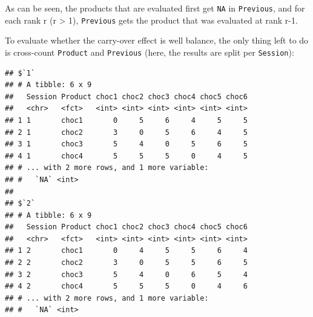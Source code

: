 \documentclass[
]{krantz}
\makeatletter
\newenvironment{Shaded}{\begin{snugshade}}{\end{snugshade}}
\newcommand{\AttributeTok}[1]{\textcolor[rgb]{0.61,0.61,0.61}{#1}}
\newcommand{\DecValTok}[1]{\textcolor[rgb]{0.06,0.06,0.06}{#1}}
\newcommand{\FunctionTok}[1]{\textcolor[rgb]{0,0,0}{#1}}
\newcommand{\NormalTok}[1]{#1}
\newcommand{\SpecialCharTok}[1]{\textcolor[rgb]{0,0,0}{#1}}
\newcommand{\StringTok}[1]{\textcolor[rgb]{0.5,0.5,0.5}{#1}}
\newenvironment{kframe}{%
\medskip{}
\setlength{\fboxsep}{.8em}
 \def\at@end@of@kframe{}%
 \ifinner\ifhmode%
  \def\at@end@of@kframe{\end{minipage}}%
  \begin{minipage}{\columnwidth}%
 \fi\fi%
 \def\FrameCommand##1{\hskip\@totalleftmargin \hskip-\fboxsep
 \colorbox{shadecolor}{##1}\hskip-\fboxsep
     \hskip-\linewidth \hskip-\@totalleftmargin \hskip\columnwidth}%
 \MakeFramed {\advance\hsize-\width
   \@totalleftmargin\z@ \linewidth\hsize
   \@setminipage}}%
 {\par\unskip\endMakeFramed%
 \at@end@of@kframe}
\renewenvironment{Shaded}{\begin{kframe}}{\end{kframe}}
\makeatother
\begin{document}
As can be seen, the products that are evaluated first get \texttt{NA} in \texttt{Previous}, and for each rank r (r \textgreater{} 1), \texttt{Previous} gets the product that was evaluated at rank r-1.

To evaluate whether the carry-over effect is well balance, the only thing left to do is cross-count \texttt{Product} and \texttt{Previous} (here, the results are split per \texttt{Session}):

\begin{Shaded}
\end{Shaded}

\begin{verbatim}
## $`1`
## # A tibble: 6 x 9
##   Session Product choc1 choc2 choc3 choc4 choc5 choc6
##   <chr>   <fct>   <int> <int> <int> <int> <int> <int>
## 1 1       choc1       0     5     6     4     5     5
## 2 1       choc2       3     0     5     6     4     5
## 3 1       choc3       5     4     0     5     6     5
## 4 1       choc4       5     5     5     0     4     5
## # ... with 2 more rows, and 1 more variable:
## #   `NA` <int>
## 
## $`2`
## # A tibble: 6 x 9
##   Session Product choc1 choc2 choc3 choc4 choc5 choc6
##   <chr>   <fct>   <int> <int> <int> <int> <int> <int>
## 1 2       choc1       0     4     5     5     6     4
## 2 2       choc2       3     0     5     5     6     5
## 3 2       choc3       5     4     0     6     5     4
## 4 2       choc4       5     5     5     0     4     6
## # ... with 2 more rows, and 1 more variable:
## #   `NA` <int>
\end{verbatim}
\end{document}
